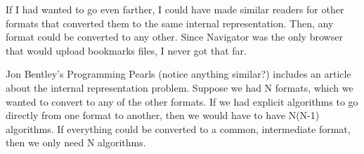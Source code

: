 If I had wanted to go even farther, I could have made similar readers
for other formats that converted them to the same internal representation.
Then, any format could be converted to any other. Since Navigator was the
only browser that would upload bookmarks files, I never got that far.

Jon Bentley's Programming Pearls (notice anything similar?) includes
an article about the internal representation problem.  Suppose we had
N formats, which we wanted to convert to any of the other formats.
If we had explicit algorithms to go directly from one format to 
another, then we would have to have N(N-1) algorithms.  If everything
could be converted to a common, intermediate format, then we only
need N algorithms.  
